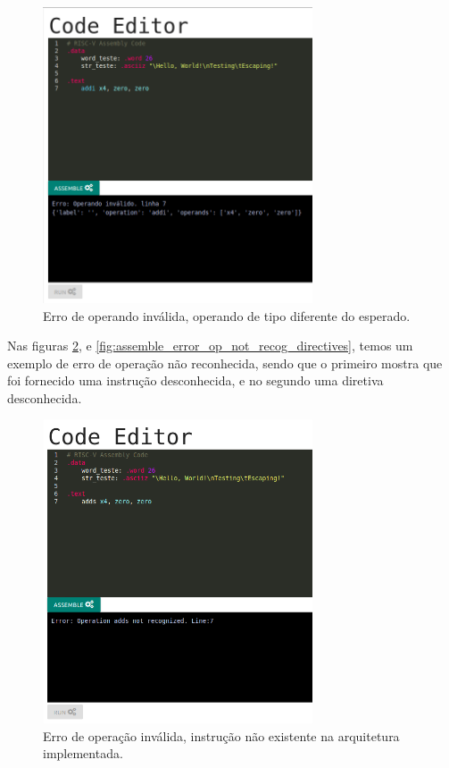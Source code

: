 	\begin{figure}[h!]
	  \centering
	  \includegraphics[width=8cm]{img/assemble_error_operando_invalido.png}
	  \caption{Erro de operando inválida, operando de tipo diferente do esperado.}
	  \label{fig:assemble_error_operando_invalido}
	\end{figure}

	 Nas figuras \ref{fig:assemble_error_operation_not_recognized}, e \ref{fig:assemble_error_op_not_recog_directives}, temos um exemplo de erro de operação não reconhecida, sendo que o primeiro mostra que foi fornecido uma instrução desconhecida, e no segundo uma diretiva desconhecida.

	\begin{figure}[h!]
	  \centering
	  \includegraphics[width=8cm]{img/assemble_error_operation_not_recognized.png}
	  \caption{Erro de operação inválida, instrução não existente na arquitetura implementada.}
	  \label{fig:assemble_error_operation_not_recognized}
	\end{figure}

